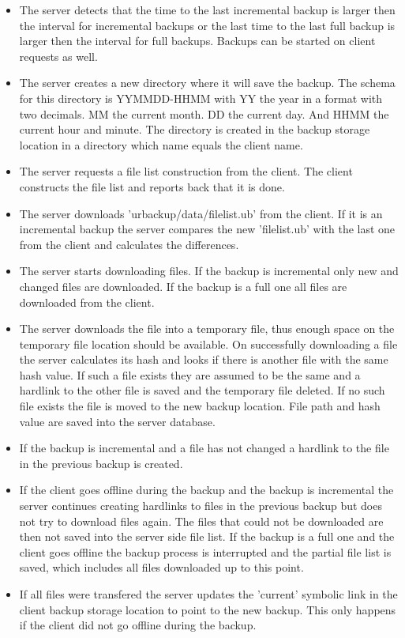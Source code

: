 \documentclass[a4paper,10pt]{article}
\begin{document}
\begin{itemize}
\item The server detects that the time to the last incremental backup is larger then the interval for incremental backups or the last time to the last full backup is larger then the interval for full backups. Backups can be started on client requests as well.
\item The server creates a new directory where it will save the backup. The schema for this directory is YYMMDD-HHMM with YY the year in a format with two decimals. MM the current month. DD the current day. And HHMM the current hour and minute. The directory is created in the backup storage location in a directory which name equals the client name.
\item The server requests a file list construction from the client. The client constructs the file list and reports back that it is done. 
\item The server downloads 'urbackup/data/filelist.ub' from the client. If it is an incremental backup the server compares the new 'filelist.ub' with the last one from the client and calculates the differences.
\item The server starts downloading files. If the backup is incremental only new and changed files are downloaded. If the backup is a full one all files are downloaded from the client.
\item The server downloads the file into a temporary file, thus enough space on the temporary file location should be available. On successfully downloading a file the server calculates its hash and looks if there is another file with the same hash value. If such a file exists they are assumed to be the same and a hardlink to the other file is saved and the temporary file deleted. If no such file exists the file is moved to the new backup location. File path and hash value are saved into the server database.
\item If the backup is incremental and a file has not changed a hardlink to the file in the previous backup is created.
\item If the client goes offline during the backup and the backup is incremental the server continues creating hardlinks to files in the previous backup but does not try to download files again. The files that could not be downloaded are then not saved into the server side file list. If the backup is a full one and the client goes offline the backup process is interrupted and the partial file list is saved, which includes all files downloaded up to this point.
\item If all files were transfered the server updates the 'current' symbolic link in the client backup storage location to point to the new backup. This only happens if the client did not go offline during the backup.
\end{itemize}
\end{document}
